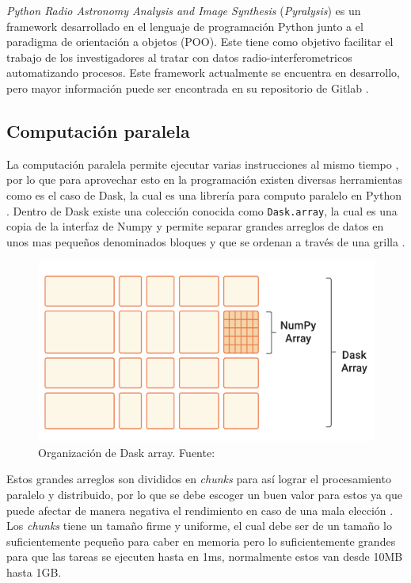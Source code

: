 \textit{Python Radio Astronomy Analysis and Image Synthesis} (\textit{Pyralysis}) es un framework desarrollado en el lenguaje de programación Python junto a el paradigma de orientación a objetos (POO). Este tiene como objetivo facilitar el trabajo de los investigadores al tratar con datos radio-interferometricos automatizando procesos. Este framework actualmente se encuentra en desarrollo, pero mayor información puede ser encontrada en su repositorio de Gitlab \citep{winNT}.

\subsection{Computación paralela}

La computación paralela permite ejecutar varias instrucciones al mismo tiempo \citep{parallel}, por lo que para aprovechar esto en la programación existen diversas herramientas como es el caso de Dask, la cual es una librería para computo paralelo en Python \citep{Dask_general}. Dentro de Dask existe una colección conocida como \verb|Dask.array|, la cual es una copia de la interfaz de Numpy y permite separar grandes arreglos de datos en unos mas pequeños denominados bloques y que se ordenan a través de una grilla \citep{Dask_array}.  

\begin{figure}[!ht]
	\centering
	\captionsetup{justification=centering}
	\includegraphics[scale=0.6]{images/dask_array.png}
	\caption[Organización de Dask array.]{Organización de Dask array. Fuente: \citep{Dask_array}}
	\label{fig:dask_array}
\end{figure}

Estos grandes arreglos son divididos en \textit{chunks} para así lograr el procesamiento paralelo y distribuido, por lo que se debe escoger un buen valor para estos ya que puede afectar de manera negativa el rendimiento en caso de una mala elección \citep{Dask_chunks}. Los \textit{chunks} tiene un tamaño firme y uniforme, el cual debe ser de un tamaño lo suficientemente pequeño para caber en memoria pero lo suficientemente grandes para que las tareas se ejecuten hasta en 1ms, normalmente estos van desde 10MB hasta 1GB. 

